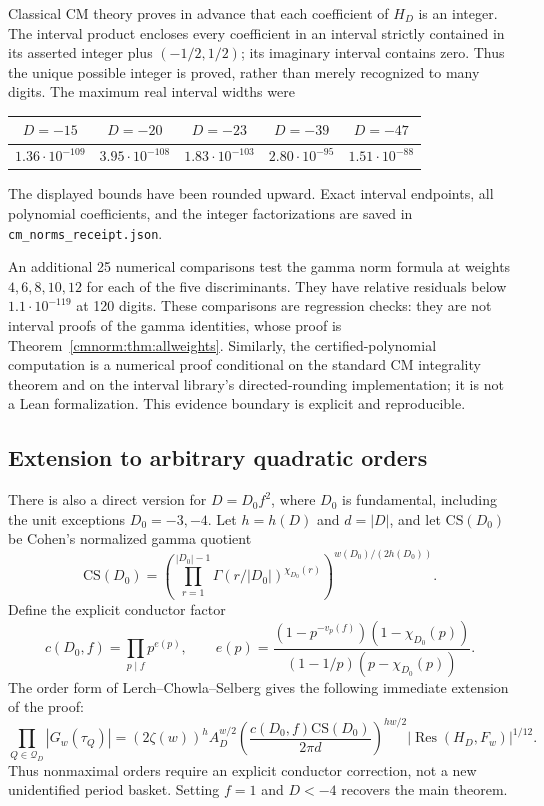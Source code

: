 Classical CM theory proves in advance that each coefficient of $H_D$
is an integer. The interval product encloses every coefficient in an
interval strictly contained in its asserted integer plus
$(-1/2,1/2)$; its imaginary interval contains zero. Thus the unique
possible integer is proved, rather than merely recognized to many digits.
The maximum real interval widths were
\begin{center}
\begin{tabular}{c c c c c}
\toprule
$D=-15$&$D=-20$&$D=-23$&$D=-39$&$D=-47$\\
\midrule
$1.36\cdot10^{-109}$&$3.95\cdot10^{-108}$&$1.83\cdot10^{-103}$&
$2.80\cdot10^{-95}$&$1.51\cdot10^{-88}$\\
\bottomrule
\end{tabular}
\end{center}
The displayed bounds have been rounded upward. Exact interval endpoints,
all polynomial coefficients, and the integer factorizations are saved
in \texttt{cm\_norms\_receipt.json}.

An additional 25 numerical comparisons test the gamma norm formula at
weights $4,6,8,10,12$ for each of the five discriminants. They have
relative residuals below $1.1\cdot10^{-119}$ at 120 digits. These
comparisons are regression checks: they are not interval proofs of the
gamma identities, whose proof is Theorem~\ref{cmnorm:thm:allweights}.
Similarly, the certified-polynomial computation is a numerical proof
conditional on the standard CM integrality theorem and on the interval
library's directed-rounding implementation; it is not a Lean
formalization. This evidence boundary is explicit and reproducible.

\subsection{Extension to arbitrary quadratic orders}

There is also a direct version for $D=D_0f^2$, where $D_0$ is fundamental,
including the unit exceptions $D_0=-3,-4$. Let $h=h(D)$ and
$d=|D|$, and let $\mathrm{CS}(D_0)$ be Cohen's normalized gamma
quotient
\[
 \mathrm{CS}(D_0)=
 \left(\prod_{r=1}^{|D_0|-1}\Gamma(r/|D_0|)^{\chi_{D_0}(r)}
 \right)^{w(D_0)/(2h(D_0))}.
\]
Define the explicit conductor factor
\[
 c(D_0,f)=\prod_{p\mid f}p^{e(p)},\qquad
 e(p)=\frac{(1-p^{-v_p(f)})(1-\chi_{D_0}(p))}
 {(1-1/p)(p-\chi_{D_0}(p))}.
\]
The order form of Lerch--Chowla--Selberg\cite{cmnorm:Barquero,cmnorm:Cohen2026}
gives the following immediate extension of the proof:
\begin{equation}
 \prod_{Q\in\mathcal Q_D}|G_w(\tau_Q)|
 =(2\zeta(w))^h A_D^{w/2}
 \left(\frac{c(D_0,f)\mathrm{CS}(D_0)}{2\pi d}\right)^{hw/2}
 |\operatorname{Res}(H_D,F_w)|^{1/12}.
 \label{cmnorm:eq:orders}
\end{equation}
Thus nonmaximal orders require an explicit conductor correction, not a
new unidentified period basket. Setting $f=1$ and $D<-4$ recovers the
main theorem.

